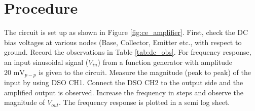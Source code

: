 \section{Procedure}
The circuit is set up as shown in Figure \ref{fig:ce_amplifier}. First, check the DC bias voltages at various nodes (Base, Collector, Emitter etc., with respect to ground. Record the observations in Table \ref{tab:dc_obs}. For frequency response, an input sinusoidal signal ($V_{in}$) from a function generator with amplitude $20\text{ mV}_{p-p}$  is given to the circuit. Measure the magnitude (peak to peak) of the input by using DSO CH1. Connect the DSO CH2 to the output side and the amplified output is observed. Increase the frequency in steps and observe the magnitude of $V_{out}$. The frequency response is plotted in a semi log sheet.

